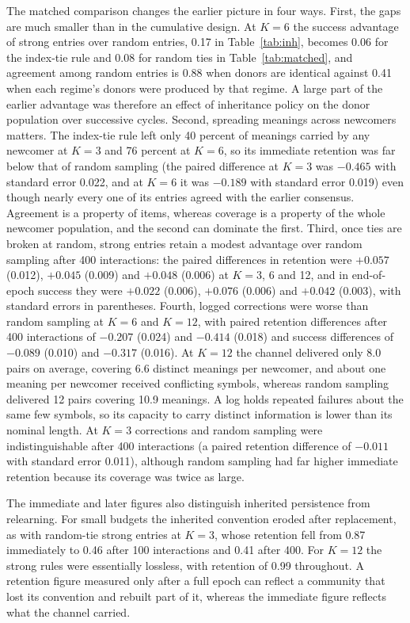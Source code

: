 \documentclass[11pt]{article}
\begin{document}
The matched comparison changes the earlier picture in four ways. First, the gaps are much smaller than in the cumulative design. At $K=6$ the success advantage of strong entries over random entries, 0.17 in Table~\ref{tab:inh}, becomes 0.06 for the index-tie rule and 0.08 for random ties in Table~\ref{tab:matched}, and agreement among random entries is 0.88 when donors are identical against 0.41 when each regime's donors were produced by that regime. A large part of the earlier advantage was therefore an effect of inheritance policy on the donor population over successive cycles. Second, spreading meanings across newcomers matters. The index-tie rule left only 40 percent of meanings carried by any newcomer at $K=3$ and 76 percent at $K=6$, so its immediate retention was far below that of random sampling (the paired difference at $K=3$ was $-0.465$ with standard error 0.022, and at $K=6$ it was $-0.189$ with standard error 0.019) even though nearly every one of its entries agreed with the earlier consensus. Agreement is a property of items, whereas coverage is a property of the whole newcomer population, and the second can dominate the first. Third, once ties are broken at random, strong entries retain a modest advantage over random sampling after 400 interactions: the paired differences in retention were $+0.057$ (0.012), $+0.045$ (0.009) and $+0.048$ (0.006) at $K=3$, 6 and 12, and in end-of-epoch success they were $+0.022$ (0.006), $+0.076$ (0.006) and $+0.042$ (0.003), with standard errors in parentheses. Fourth, logged corrections were worse than random sampling at $K=6$ and $K=12$, with paired retention differences after 400 interactions of $-0.207$ (0.024) and $-0.414$ (0.018) and success differences of $-0.089$ (0.010) and $-0.317$ (0.016). At $K=12$ the channel delivered only 8.0 pairs on average, covering 6.6 distinct meanings per newcomer, and about one meaning per newcomer received conflicting symbols, whereas random sampling delivered 12 pairs covering 10.9 meanings. A log holds repeated failures about the same few symbols, so its capacity to carry distinct information is lower than its nominal length. At $K=3$ corrections and random sampling were indistinguishable after 400 interactions (a paired retention difference of $-0.011$ with standard error 0.011), although random sampling had far higher immediate retention because its coverage was twice as large.

The immediate and later figures also distinguish inherited persistence from relearning. For small budgets the inherited convention eroded after replacement, as with random-tie strong entries at $K=3$, whose retention fell from 0.87 immediately to 0.46 after 100 interactions and 0.41 after 400. For $K=12$ the strong rules were essentially lossless, with retention of 0.99 throughout. A retention figure measured only after a full epoch can reflect a community that lost its convention and rebuilt part of it, whereas the immediate figure reflects what the channel carried.
\end{document}
